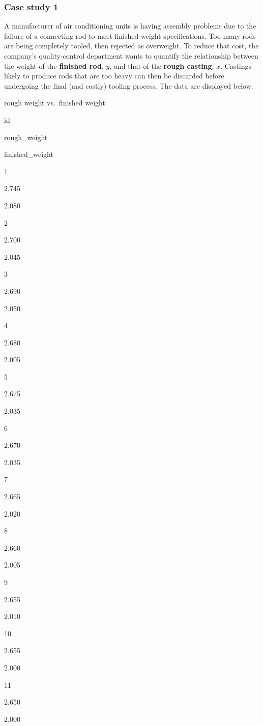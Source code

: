 \documentclass[]{article}
\begin{document}
\hypertarget{case-study-1}{%
\subsubsection{Case study 1}\label{case-study-1}}

A manufacturer of air conditioning units is having assembly problems due
to the failure of a connecting rod to meet finished-weight
specifications. Too many rods are being completely tooled, then rejected
as overweight. To reduce that cost, the company's quality-control
department wants to quantify the relationship between the weight of the
\textbf{finished rod}, \(y\), and that of the \textbf{rough casting},
\(x\). Castings likely to produce rods that are too heavy can then be
discarded before undergoing the final (and costly) tooling process. The
data are displayed below.

rough weight vs.~finished weight

id

rough\_weight

finished\_weight

1

2.745

2.080

2

2.700

2.045

3

2.690

2.050

4

2.680

2.005

5

2.675

2.035

6

2.670

2.035

7

2.665

2.020

8

2.660

2.005

9

2.655

2.010

10

2.655

2.000

11

2.650

2.000
\end{document}
